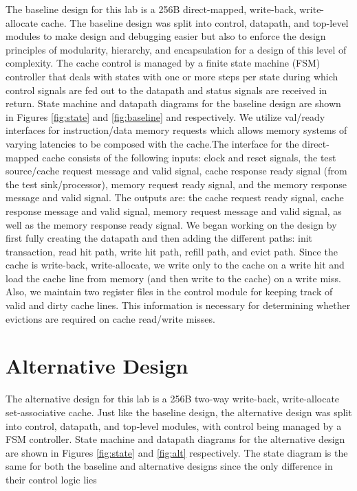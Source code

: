 \documentclass[10pt]{article}
\begin{document}
The baseline design for this lab is a 256B direct-mapped, write-back, write-allocate cache. The baseline design was split into control, datapath, and top-level modules to make design and debugging easier but also to enforce the design principles of modularity, hierarchy, and encapsulation for a design of this level of complexity. The cache control is managed by a finite state machine (FSM) controller that deals with states with one or more steps per state during which control signals are fed out to the datapath and status signals are received in return. State machine and datapath diagrams for the baseline design are shown in Figures \ref{fig:state} and \ref{fig:baseline} and respectively. We utilize val/ready interfaces for instruction/data memory requests which allows memory systems of varying latencies to be composed with the cache.The interface for the direct-mapped cache consists of the following inputs: clock and reset signals, the test source/cache request message and valid signal, cache response ready signal (from the test sink/processor), memory request ready signal, and the memory response message and valid signal. The outputs are: the cache request ready signal, cache response message and valid signal, memory request message and valid signal, as well as the memory response ready signal. We began working on the design by first fully creating the datapath and then adding the different paths: init transaction, read hit path, write hit path, refill path, and evict path. Since the cache is write-back, write-allocate, we write only to the cache on a write hit and load the cache line from memory (and then write to the cache) on a write miss. Also, we maintain two register files in the control module for keeping track of valid and dirty cache lines. This information is necessary for determining whether evictions are required on cache read/write misses. \\


\section{Alternative Design}

The alternative design for this lab is a 256B two-way write-back, write-allocate set-associative cache. Just like the baseline design, the alternative design was split into control, datapath, and top-level modules, with control being managed by a FSM controller. State machine and datapath diagrams for the alternative design are shown in Figures \ref{fig:state} and \ref{fig:alt} respectively. The state diagram is the same for both the baseline and alternative designs since the only difference in their control logic lies 
\end{document}
